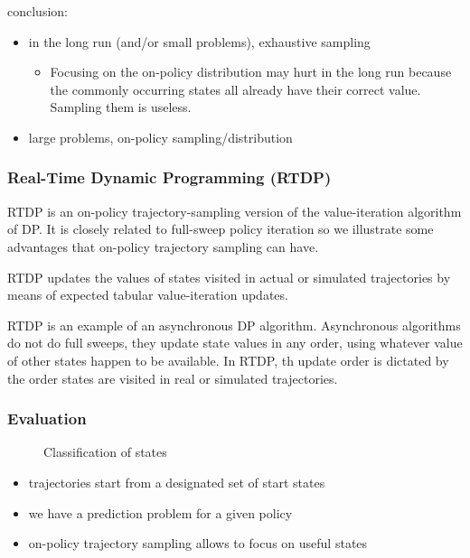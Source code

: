 \documentclass[sutton_barto_notes.tex]{subfiles}
\begin{document}
conclusion:
\begin{itemize}
\item in the long run (and/or small problems), exhaustive sampling
\begin{itemize}
	\item Focusing on the on-policy distribution may hurt in the long run because the commonly occurring states all already have their correct value. Sampling them is useless.
\end{itemize}
\item large problems, on-policy sampling/distribution
\end{itemize}

\subsubsection{Real-Time Dynamic Programming (RTDP)}

RTDP is an on-policy trajectory-sampling version of the value-iteration algorithm of DP. It is closely related to full-sweep policy iteration so we illustrate some advantages that on-policy trajectory sampling can have.

RTDP updates the values of states visited in actual or simulated trajectories by means of expected tabular value-iteration updates.

RTDP is an example of an asynchronous DP algorithm. Asynchronous algorithms do not do full sweeps, they update state values in any order, using whatever value of other states happen to be available. In RTDP, th update order is dictated by the order states are visited in real or simulated trajectories.

\subsubsection{Evaluation}

\begin{figure}[h!]
    \centering
    \caption{ Classification of states }
\end{figure}

\begin{itemize}
\item trajectories start from a designated set of start states
\item we have a prediction problem for a given policy
\item on-policy trajectory sampling allows to focus on useful states
\end{itemize}
\end{document}
